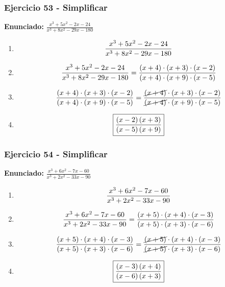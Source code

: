 \documentclass[11pt,a4paper]{article}
\newcommand{\fitmath}[1]{%
\[
\setbox0=\hbox{$\displaystyle #1$}%
\ifdim\wd0>\linewidth
\resizebox{\linewidth}{!}{$\displaystyle #1$}%
\else
#1%
\fi
\]
}
\begin{document}
\vspace{0.12cm}
\subsubsection*{Ejercicio 53 - Simplificar}
\textbf{Enunciado:} $ \frac{x^{3} + 5 x^{2} - 2 x - 24}{x^{3} + 8 x^{2} - 29 x - 180} $\par
\begin{enumerate}[leftmargin=2em]
\item \fitmath{\frac{x^{3} + 5 x^{2} - 2 x - 24}{x^{3} + 8 x^{2} - 29 x - 180}}
\item \fitmath{\frac{x^{3} + 5 x^{2} - 2 x - 24}{x^{3} + 8 x^{2} - 29 x - 180}=\frac{\left(x + 4\right)\cdot \left(x + 3\right)\cdot \left(x - 2\right)}{\left(x + 4\right)\cdot \left(x + 9\right)\cdot \left(x - 5\right)}}
\item \fitmath{\frac{\left(x + 4\right)\cdot \left(x + 3\right)\cdot \left(x - 2\right)}{\left(x + 4\right)\cdot \left(x + 9\right)\cdot \left(x - 5\right)}=\frac{\cancel{\left(x + 4\right)}\cdot \left(x + 3\right)\cdot \left(x - 2\right)}{\cancel{\left(x + 4\right)}\cdot \left(x + 9\right)\cdot \left(x - 5\right)}}
\item \fitmath{\boxed{\frac{\left(x - 2\right) \left(x + 3\right)}{\left(x - 5\right) \left(x + 9\right)}}}
\end{enumerate}

\vspace{0.12cm}
\subsubsection*{Ejercicio 54 - Simplificar}
\textbf{Enunciado:} $ \frac{x^{3} + 6 x^{2} - 7 x - 60}{x^{3} + 2 x^{2} - 33 x - 90} $\par
\begin{enumerate}[leftmargin=2em]
\item \fitmath{\frac{x^{3} + 6 x^{2} - 7 x - 60}{x^{3} + 2 x^{2} - 33 x - 90}}
\item \fitmath{\frac{x^{3} + 6 x^{2} - 7 x - 60}{x^{3} + 2 x^{2} - 33 x - 90}=\frac{\left(x + 5\right)\cdot \left(x + 4\right)\cdot \left(x - 3\right)}{\left(x + 5\right)\cdot \left(x + 3\right)\cdot \left(x - 6\right)}}
\item \fitmath{\frac{\left(x + 5\right)\cdot \left(x + 4\right)\cdot \left(x - 3\right)}{\left(x + 5\right)\cdot \left(x + 3\right)\cdot \left(x - 6\right)}=\frac{\cancel{\left(x + 5\right)}\cdot \left(x + 4\right)\cdot \left(x - 3\right)}{\cancel{\left(x + 5\right)}\cdot \left(x + 3\right)\cdot \left(x - 6\right)}}
\item \fitmath{\boxed{\frac{\left(x - 3\right) \left(x + 4\right)}{\left(x - 6\right) \left(x + 3\right)}}}
\end{enumerate}
\end{document}
